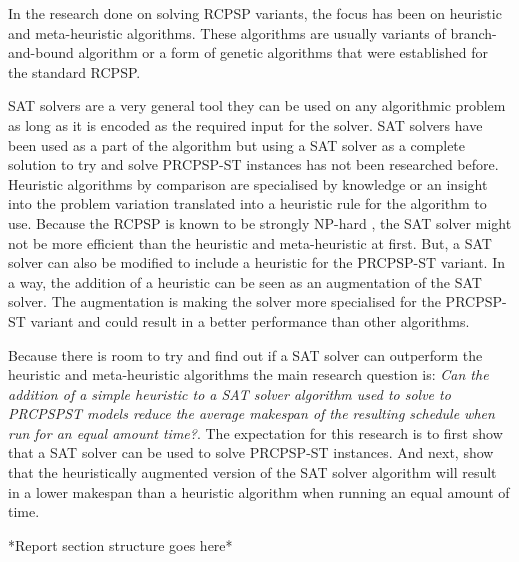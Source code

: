 In the research done on solving RCPSP variants, the focus has been on heuristic and meta-heuristic algorithms. These algorithms are usually variants of branch-and-bound algorithm \cite{RN21} or a form of genetic algorithms \cite{RN28} that were established for the standard RCPSP.

SAT solvers are a very general tool they can be used on any algorithmic problem as long as it is encoded as the required input for the solver. SAT solvers have been used as a part of the algorithm but using a SAT solver as a complete solution to try and solve PRCPSP-ST instances has not been researched before. Heuristic algorithms by comparison are specialised by knowledge or an insight into the problem variation translated into a heuristic rule for the algorithm to use. Because the RCPSP is known to be strongly NP-hard \cite{RN20}, the SAT solver might not be more efficient than the heuristic and meta-heuristic at first. But, a SAT solver can also be modified to include a heuristic for the PRCPSP-ST variant. In a way, the addition of a heuristic can be seen as an augmentation of the SAT solver. The augmentation is making the solver more specialised for the PRCPSP-ST variant and could result in a better performance than other algorithms. 

Because there is room to try and find out if a SAT solver can outperform the heuristic and meta-heuristic algorithms the main research question is: \textit{Can the addition of a simple heuristic to a SAT solver algorithm used to solve to PRCPSPST models reduce the average makespan of the resulting schedule when run for an equal amount time?}. The expectation for this research is to first show that a SAT solver can be used to solve PRCPSP-ST instances. And next, show that the heuristically augmented version of the SAT solver algorithm will result in a lower makespan than a heuristic algorithm when running an equal amount of time.

*Report section structure goes here*